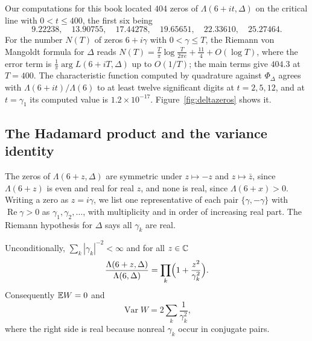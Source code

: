 Our computations for this book located $404$ zeros of $\Lambda(6+it,\Delta)$ on the critical line with $0<t\le400$, the first six being
\[
9.22238,\quad 13.90755,\quad 17.44278,\quad 19.65651,\quad 22.33610,\quad 25.27464 .
\]
For the number $N(T)$ of zeros $6+i\gamma$ with $0<\gamma\le T$, the Riemann von Mangoldt formula for $\Delta$ reads $N(T) = \frac{T}{\pi}\log\frac{T}{2\pi e}+\frac{11}{4}+O(\log T)$, where the error term is $\frac1\pi\arg L(6+iT,\Delta)$ up to $O(1/T)$; the main terms give $404.3$ at $T=400$. The characteristic function computed by quadrature against $\Phi_\Delta$ agrees with $\Lambda(6+it)/\Lambda(6)$ to at least twelve significant digits at $t = 2,5,12$, and at $t=\gamma_1$ its computed value is $1.2\times10^{-17}$. Figure~\ref{fig:deltazeros} shows it.


\subsection{The Hadamard product and the variance identity}

The zeros of $\Lambda(6+z,\Delta)$ are symmetric under $z\mapsto-z$ and $z\mapsto\bar z$, since $\Lambda(6+z)$ is even and real for real $z$, and none is real, since $\Lambda(6+x)>0$. Writing a zero as $z = i\gamma$, we list one representative of each pair $\{\gamma,-\gamma\}$ with $\operatorname{Re}\gamma>0$ as $\gamma_1,\gamma_2,\dots$, with multiplicity and in order of increasing real part. The Riemann hypothesis for $\Delta$ says all $\gamma_k$ are real.

\begin{theorem}\label{thm:ch10hadamard}
Unconditionally, $\sum_k|\gamma_k|^{-2}<\infty$ and for all $z\in\mathbb{C}$
\[
\frac{\Lambda(6+z,\Delta)}{\Lambda(6,\Delta)} = \prod_k\Bigl(1+\frac{z^2}{\gamma_k^2}\Bigr).
\]
Consequently $\mathbb{E} W = 0$ and
\[
\operatorname{Var}W = 2\sum_k\frac{1}{\gamma_k^2},
\]
where the right side is real because nonreal $\gamma_k$ occur in conjugate pairs.
\end{theorem}


